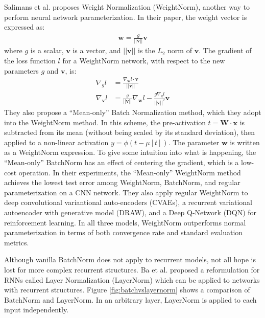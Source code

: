 \documentclass{article}
\begin{document}
Salimans et al. \cite{reparameter} proposes Weight Normalization (WeightNorm), another way to perform neural network parameterization. In their paper, the weight vector is expressed as:
\begin{align*}
    \textbf{w}=\frac{g}{||\textbf{v}||}\textbf{v}
\end{align*}
where $g$ is a scalar, $\textbf{v}$ is a vector, and $||\textbf{v}||$ is the $L_2$ norm of $\textbf{v}$. The gradient of the loss function $l$ for a WeightNorm network, with respect to the new parameters $g$ and $\textbf{v}$, is:
\begin{align*}
    \nabla_gl &= \frac{\nabla_{\textbf{w}}l\cdot\textbf{v}}{||\textbf{v}||}\\
    \nabla_{\textbf{v}}l &= \frac{g}{||\textbf{v}||}\nabla_{\textbf{w}}l-\frac{g\nabla_gl}{||\textbf{v}||^2}\textbf{v}
\end{align*}
They also propose a ``Mean-only'' Batch Normalization method, which they adopt into the WeightNorm method. In this scheme, the pre-activation $t=\textbf{W}\cdot\textbf{x}$ is subtracted from its mean (without being scaled by its standard deviation), then applied to a non-linear activation $y=\phi(t-\mu[t])$. The parameter $\textbf{w}$ is written as a WeightNorm expression. To give some intuition into what is happening, the ``Mean-only'' BatchNorm has an effect of centering the gradient, which is a low-cost operation. In their experiments, the ``Mean-only'' WeightNorm method achieves the lowest test error among WeightNorm, BatchNorm, and regular parameterization on a CNN network. They also apply regular WeightNorm to deep convolutional variantional auto-encoders (CVAEs), a recurrent variational autoencoder with generative model (DRAW), and a Deep Q-Network (DQN) for reinforcement learning. In all three models, WeightNorm outperforms normal parameterization in terms of both convergence rate and standard evaluation metrics.

\textbf{}

Although vanilla BatchNorm does not apply to recurrent models, not all hope is lost for more complex recurrent structures. Ba et al. \cite{layernorm} proposed a reformulation for RNNs called Layer Normalization (LayerNorm) which can be applied to networks with recurrent structures. Figure \ref{fig:batchvslayernorm} shows a comparison of BatchNorm and LayerNorm.  In an arbitrary layer, LayerNorm is applied to each input independently. 
\end{document}
